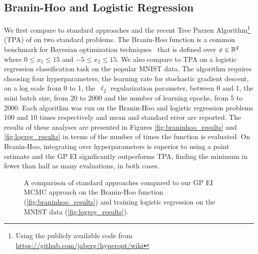 \documentclass[aos,preprint]{imsart}
\begin{document}
\subsection{Branin-Hoo and Logistic Regression}
\label{sec:branin}
We first compare to standard approaches and the recent Tree Parzen
Algorithm\footnote{Using the publicly available code from
  \url{https://github.com/jaberg/hyperopt/wiki}} (TPA) of
\citet{BergstraJ2011} on two standard problems.  The Branin-Hoo
function is a common benchmark for Bayesian optimization
techniques~\citep{Jones2001} that is defined over $x \in \mathbb{R}^2$
where $0 \leq x_1 \leq 15$ and $-5 \leq x_2 \leq 15$.  We also compare
to TPA on a logistic regression classification task on the popular
MNIST data. The algorithm requires choosing four hyperparameters, the
learning rate for stochastic gradient descent, on a log scale from 0
to 1, the~$\ell_2$ regularization parameter, between 0 and 1, the mini batch
size, from 20 to 2000 and the number of learning epochs, from 5 to
2000.  Each algorithm was run on the Branin-Hoo and logistic
regression problems 100 and 10 times respectively and mean and
standard error are reported.  The results of these analyses are
presented in Figures \ref{fig:braninhoo_results} and
\ref{fig:logreg_results} in terms of the number of times the function
is evaluated.  On Branin-Hoo, integrating over hyperparameters
is superior to using a point estimate and the GP EI significantly
outperforms TPA, finding the minimum in fewer than half as many
evaluations, in both cases.

\begin{figure}[t]
\begin{center}

\end{center}
\caption{A comparison of standard approaches compared to our GP EI MCMC approach on the Branin-Hoo function (\ref{fig:braninhoo_results}) and training logistic regression on the MNIST data (\ref{fig:logreg_results}).}
\end{figure}
\end{document}

